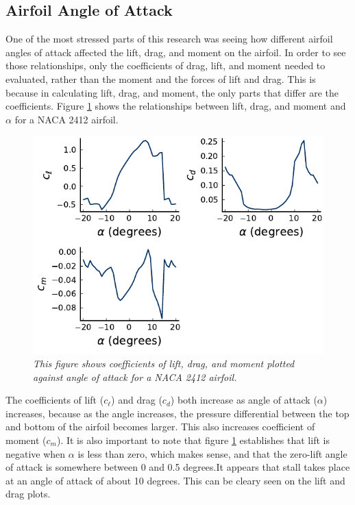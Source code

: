 \documentclass{journal}
\begin{document}
	\subsection{Airfoil Angle  of Attack}
	One of the most stressed parts of this research was seeing how different airfoil angles of attack affected the lift, drag, and moment on the airfoil. In order to see those relationships, only the coefficients of drag, lift, and moment needed to evaluated, rather than the moment and the forces of lift and drag. This is because in calculating lift, drag, and moment, the only parts that differ are the coefficients. Figure \ref{fig:aoa-coefficients} shows the relationships between lift, drag, and moment and \(\alpha\) for a NACA 2412 airfoil.\\
	
	\begin{figure}[H]
		\centering
		\includegraphics{../graphics/aoa-coefficients.pdf}
		\caption{\emph{This figure shows coefficients of lift, drag, and moment plotted against angle of attack for a NACA 2412 airfoil.}}
		\label{fig:aoa-coefficients}
	\end{figure}
	
	The coefficients of lift (\(c_\ell\)) and drag (\(c_d\)) both increase as angle of attack (\(\alpha\)) increases, because as the angle increases, the pressure differential between the top and bottom of the airfoil becomes larger. This also increases coefficient of moment (\(c_m\)). It is also important to note that figure \ref{fig:aoa-coefficients} establishes that lift is negative when \(\alpha\) is less than zero, which makes sense, and that the zero-lift angle of attack is somewhere between 0 and 0.5 degrees.It appears that stall takes place at an angle of attack of about 10 degrees. This can be cleary seen on the lift and drag plots.\\
	
\end{document}
